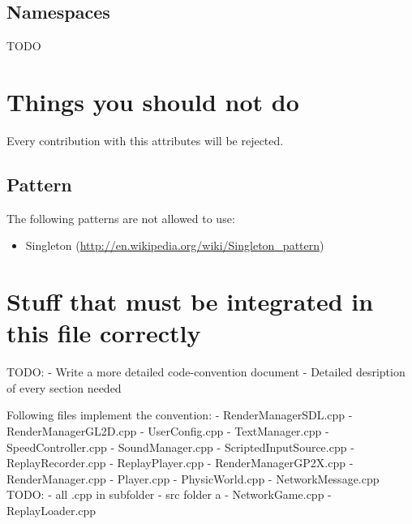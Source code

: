 \documentclass[a4paper]{scrartcl}
\begin{document}
\subsection{Namespaces}
TODO


\section{Things you should not do}
Every contribution with this attributes will be rejected.



\subsection{Pattern}
The following patterns are not allowed to use:
\begin{itemize}
	\item Singleton (\url{http://en.wikipedia.org/wiki/Singleton_pattern})
\end{itemize}
 


\section{Stuff that must be integrated in this file correctly}
TODO:
- Write a more detailed code-convention document
- Detailed desription of every section needed

Following files implement the convention:
- RenderManagerSDL.cpp
- RenderManagerGL2D.cpp
- UserConfig.cpp
- TextManager.cpp
- SpeedController.cpp
- SoundManager.cpp
- ScriptedInputSource.cpp
- ReplayRecorder.cpp
- ReplayPlayer.cpp
- RenderManagerGP2X.cpp
- RenderManager.cpp
- Player.cpp
- PhysicWorld.cpp
- NetworkMessage.cpp
TODO:
- all .cpp in subfolder
- src folder a - NetworkGame.cpp
- ReplayLoader.cpp
\end{document}
